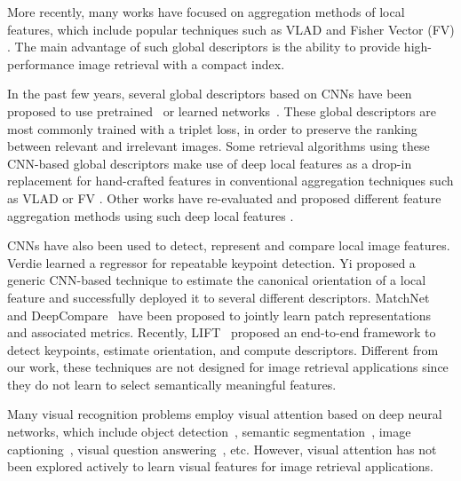\documentclass[10pt,twocolumn,letterpaper]{article}
\begin{document}
More recently, many works have focused on aggregation methods of local features, which include popular techniques such as VLAD \cite{Jegou2010} and Fisher Vector (FV) \cite{Jegou2012}.
The main advantage of such global descriptors is the ability to provide high-performance image retrieval with a compact index.

In the past few years, several global descriptors based on CNNs have been proposed to use pretrained~\cite{babenko2014neural,tolias2015particular} or learned networks~\cite{arandjelovic2015netvlad,radenovic2016cnn,gordo2016deep}.
These global descriptors are most commonly trained with a triplet loss, in order to preserve the ranking between relevant and irrelevant images.
Some retrieval algorithms using these CNN-based global descriptors make use of deep local features as a drop-in replacement for hand-crafted features in conventional aggregation techniques such as VLAD or FV \cite{yue2015exploiting,uricchio2015fisher}.
Other works have re-evaluated and proposed different feature aggregation methods using such deep local features \cite{babenko2015iccv,kalantidis2015cross}.

CNNs have also been used to detect, represent and compare local image features.
Verdie \etal \cite{verdie2015tilde} learned a regressor for repeatable keypoint detection.
Yi \etal \cite{moo2016learning} proposed a generic CNN-based technique to estimate the canonical orientation of a local feature and successfully deployed it to several different descriptors.
MatchNet~\cite{han2015matchnet} and DeepCompare~\cite{zagoruyko2015learning} have been proposed to jointly learn patch representations and associated metrics.
Recently, LIFT~\cite{yi2016lift} proposed an end-to-end framework to detect keypoints, estimate orientation, and compute descriptors.
Different from our work, these techniques are not designed for image retrieval applications since they do not learn to select semantically meaningful features.


Many visual recognition problems employ visual attention based on deep neural networks, which include object detection~\cite{zhou2016learning}, semantic segmentation~\cite{hong2015decoupled}, image captioning~\cite{xu2015show}, visual question answering~\cite{yang2016stacked}, etc.
However, visual attention has not been explored actively to learn visual features for image retrieval applications.
\end{document}
